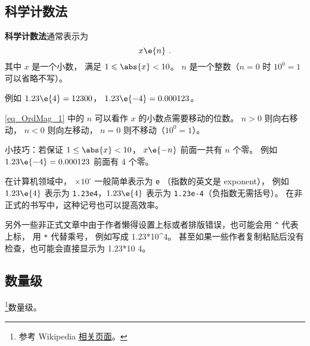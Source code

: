 
\begin{issues}
\issueDraft
\end{issues}

\subsection{科学计数法}
\textbf{科学计数法}通常表示为
\begin{equation}\label{eq_OrdMag_1}
x \e{n}~.
\end{equation}
其中 $x$ 是一个小数， 满足 $1 \leqslant \abs{x} < 10$。 $n$ 是一个整数（$n=0$ 时 $10^{0} = 1$ 可以省略不写）。

例如 $1.23\e{4} = 12300$， $1.23\e{-4} = 0.000123$。

\autoref{eq_OrdMag_1} 中的 $n$ 可以看作 $x$ 的小数点需要移动的位数。 $n > 0$ 则向右移动， $n < 0$ 则向左移动， $n=0$ 则不移动（$10^{0} = 1$）。

小技巧：若保证 $1 \le \abs{x} < 10$， $x\e{-n}$ 前面一共有 $n$ 个零。 例如 $1.23\e{-4} = 0.000123$ 前面有 4 个零。

在计算机领域中， $\times 10^\square$ 一般简单表示为 \verb`e` （指数的英文是 exponent）， 例如 $1.23\e{4}$ 表示为 \verb`1.23e4`，$1.23\e{4}$ 表示为 \verb`1.23e-4`（负指数无需括号）。 在非正式的书写中，这种记号也可以提高效率。

另外一些非正式文章中由于作者懒得设置上标或者排版错误，也可能会用 \verb`^` 代表上标， 用 \verb`*` 代替乘号， 例如写成 1.23*10^4。 甚至如果一些作者复制粘贴后没有检查，也可能会直接显示为 1.23*10 4。

\subsection{数量级}
\footnote{参考 Wikipedia \href{https://en.wikipedia.org/wiki/Order_of_magnitude}{相关页面}。}数量级。
